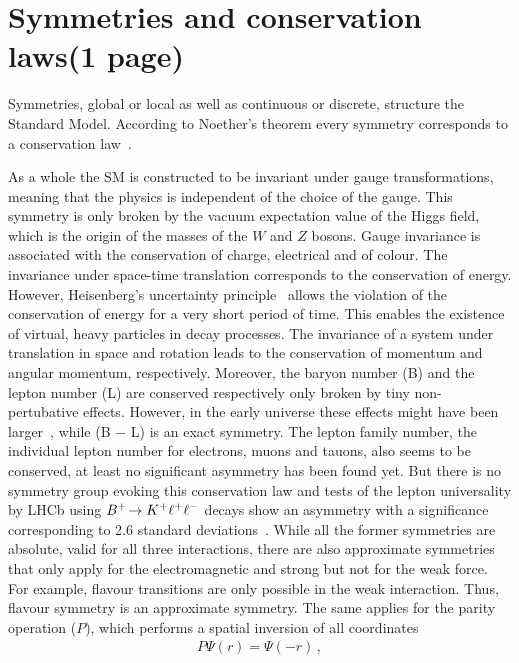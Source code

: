 
\section{Symmetries and conservation laws(1 page)}
\label{sec:standardmodel:symmetries}

Symmetries, global or local as well as continuous or discrete, structure the
Standard Model. According to Noether's theorem every symmetry corresponds to a
conservation law~\cite{Noether}.

As a whole the SM is constructed to be invariant under gauge transformations,
meaning that the physics is independent of the choice of the gauge. This
symmetry is only broken by the vacuum expectation value of the Higgs field,
which is the origin of the masses of the $W$ and $Z$ bosons. Gauge invariance
is associated with the conservation of charge, electrical and of colour. The
invariance under space-time translation corresponds to the conservation of
energy. However, Heisenberg's uncertainty principle~\cite{Heisenberg:1927zz}
allows the violation of the conservation of energy for a very short period of
time. This enables the existence of virtual, heavy particles in decay
processes. The invariance of a system under translation in space and rotation
leads to the conservation of momentum and angular momentum, respectively.
Moreover, the baryon number (B) and the lepton number (L) are conserved
respectively only broken by tiny non-pertubative effects. However, in the
early universe these effects might have been larger~\cite{Rubakov:1996vz},
while (B $-$ L) is an exact symmetry. The lepton family number, \ie the
individual lepton number for electrons, muons and tauons, also seems to be
conserved, at least no significant asymmetry has been found yet. But there is
no symmetry group evoking this conservation law and tests of the lepton
universality by LHCb using \mbox{${{B}^+}\!\rightarrow {\ensuremath{{K}^+}}\ell^+\ell^-$} decays show an
asymmetry with a significance corresponding to \num{2.6} standard
deviations~\cite{LHCb-PAPER-2014-024}. While all the former symmetries are
absolute, \ie valid for all three interactions, there are also approximate
symmetries that only apply for the electromagnetic and strong but not for the
weak force. For example, flavour transitions are only possible in the weak
interaction. Thus, flavour symmetry is an approximate symmetry. The same
applies for the parity operation ($P$), which performs a spatial inversion of
all coordinates
\begin{align}
	P\Psi(r) = \Psi(-r)\,,
\end{align}
